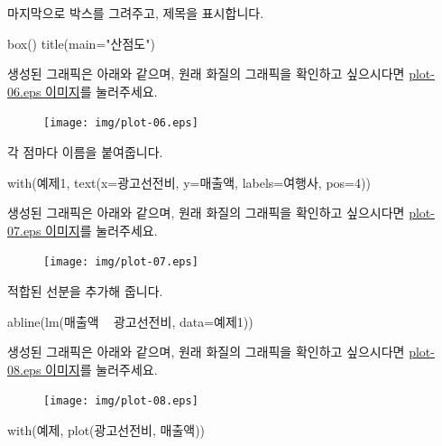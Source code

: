 마지막으로 박스를 그려주고, 제목을 표시합니다. 
\begin{Schunk}
\begin{Soutput}	
box()
title(main="산점도")
\end{Soutput}
\end{Schunk}
생성된 그래픽은 아래와 같으며, 원래 화질의 그래픽을 확인하고 싶으시다면 \href{http://korea.gnu.org/gnustats/img/plot-06.eps}{plot-06.eps 이미지}를 눌러주세요. 

\begin{figure}
\begin{center}
\texttt{[image: img/plot-06.eps]}
\end{center}
\end{figure}

각 점마다 이름을 붙여줍니다.
\begin{Schunk}
\begin{Soutput}	
with(예제1, text(x=광고선전비, y=매출액, labels=여행사, pos=4))
\end{Soutput}
\end{Schunk}
생성된 그래픽은 아래와 같으며, 원래 화질의 그래픽을 확인하고 싶으시다면 \href{http://korea.gnu.org/gnustats/img/plot-07.eps}{plot-07.eps 이미지}를 눌러주세요. 

\begin{figure}
\begin{center}
\texttt{[image: img/plot-07.eps]}
\end{center}
\end{figure}

적합된 선분을 추가해 줍니다. 
\begin{Schunk}
\begin{Soutput}	
abline(lm(매출액 ~ 광고선전비, data=예제1))
\end{Soutput}
\end{Schunk}
생성된 그래픽은 아래와 같으며, 원래 화질의 그래픽을 확인하고 싶으시다면 \href{http://korea.gnu.org/gnustats/img/plot-08.eps}{plot-08.eps 이미지}를 눌러주세요. 

\begin{figure}
\begin{center}
\texttt{[image: img/plot-08.eps]}
\end{center}
\end{figure}

\begin{Schunk}
\begin{Soutput}
with(예제, plot(광고선전비, 매출액))
\end{Soutput}
\end{Schunk}

